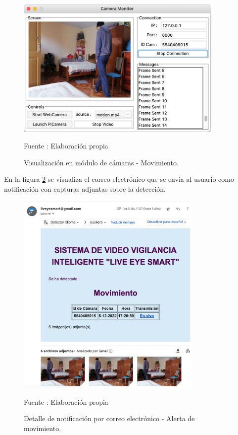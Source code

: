 \begin{figure}[H]
    \begin{center}
        \includegraphics[width=10cm]{img/capitulo_6/motion.png}
    \end{center}
    \begin{center}
        \caption{Visualización en módulo de cámaras - Movimiento.}
        Fuente : Elaboración propia
        \label{camera_movement}
    \end{center}
\end{figure}

En la figura \ref{mail_movement} se visualiza el correo electrónico que se envia al usuario como notificación con capturas adjuntas sobre la detección.

\begin{figure}[H]
    \begin{center}
        \includegraphics[width=9cm]{img/capitulo_6/mail_motion.png}
    \end{center}
    \begin{center}
        \caption{Detalle de notificación por correo electrónico - Alerta de movimiento.}
        Fuente : Elaboración propia
        \label{mail_movement}
    \end{center}
\end{figure}

